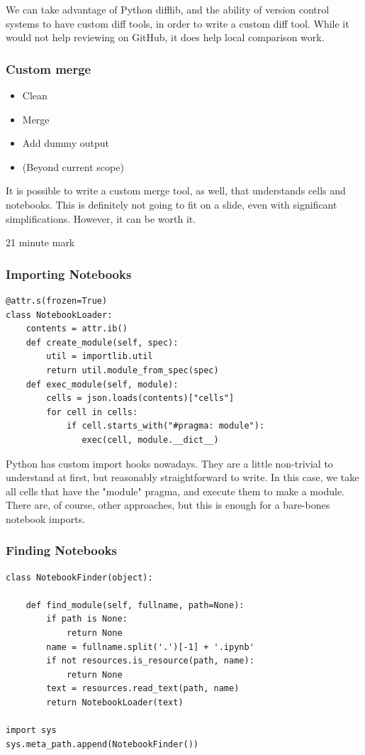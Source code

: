 We can take advantage of Python difflib,
and the ability of version control systems to
have custom diff tools,
in order to write a custom diff tool.
While it would not help reviewing on GitHub,
it does help local comparison work.

\begin{frame}
\frametitle{Custom merge}

\begin{itemize}
\item Clean
\item Merge
\item Add dummy output
\item (Beyond current scope)
\end{itemize}

\end{frame}

It is possible to write a custom merge tool,
as well,
that understands cells and notebooks.
This is definitely not going to fit on a slide,
even with significant simplifications.
However,
it can be worth it.

21 minute mark

\begin{frame}[fragile]
\frametitle{Importing Notebooks}

\begin{lstlisting}
@attr.s(frozen=True)
class NotebookLoader:
    contents = attr.ib()
    def create_module(self, spec):
        util = importlib.util
        return util.module_from_spec(spec)
    def exec_module(self, module):
        cells = json.loads(contents)["cells"]
        for cell in cells:
            if cell.starts_with("#pragma: module"):
               exec(cell, module.__dict__)
\end{lstlisting}

\end{frame}

Python has custom import hooks nowadays.
They are a little non-trivial to understand at first,
but reasonably straightforward to write.
In this case,
we take all cells that have the "module" pragma,
and execute them to make a module.
There are,
of course,
other approaches,
but this is enough for a bare-bones notebook imports.


\begin{frame}[fragile]
\frametitle{Finding Notebooks}

\begin{lstlisting}
class NotebookFinder(object):
 
    def find_module(self, fullname, path=None):
        if path is None:
            return None
        name = fullname.split('.')[-1] + '.ipynb'
        if not resources.is_resource(path, name):
            return None
        text = resources.read_text(path, name)
        return NotebookLoader(text)

import sys
sys.meta_path.append(NotebookFinder())
\end{lstlisting}

\end{frame}

